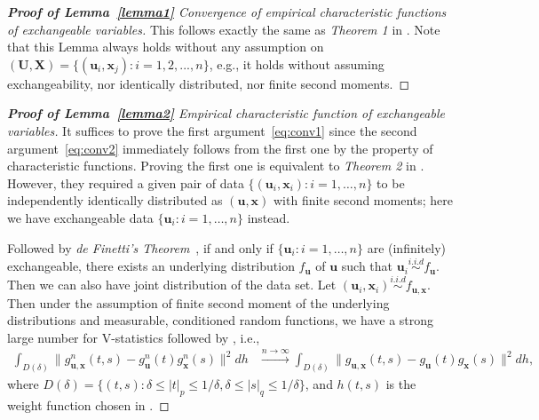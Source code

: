 \documentclass[11pt]{article}
\theoremstyle{definition}
\begin{document}
\begin{proof}[\textbf{Proof of Lemma~\ref{lemma1}} Convergence of empirical characteristic functions of exchangeable variables] 
This follows exactly the same as \textit{Theorem 1} in \cite{szekely2007measuring}. Note that this Lemma always holds without any assumption on $(\mathbf{U}, \mathbf{X} ) =  \{(\mathbf{u}_{i},\mathbf{x}_{j}) :  i=1,2,...,n\}$, e.g., it holds without assuming exchangeability, nor identically distributed, nor finite second moments.
\end{proof}

\begin{proof}[\textbf{Proof of Lemma~\ref{lemma2}} Empirical characteristic function of exchangeable variables] 
	\bigskip	
	It suffices to prove the first argument~\ref{eq:conv1} since the second argument~\ref{eq:conv2} immediately follows from the first one by the property of characteristic functions.
	Proving the first one is equivalent to \textit{Theorem 2} in \cite{szekely2007measuring}. However, they required a given pair of data $\{(\mathbf{u}_{i},\mathbf{x}_{i}) : i = 1, \ldots , n \}$ to be independently identically distributed as $(\mathbf{u},\mathbf{x})$ with finite second moments; here we have exchangeable data $\{  \mathbf{u}_{i} : i = 1, \ldots, n  \}$ instead. 
	
	Followed by \textit{de Finetti's Theorem}~\cite{diaconis1980finite}, if and only if $\{ \mathbf{u}_{i} : i = 1, \ldots, n \}$ are (infinitely) exchangeable, there exists an underlying distribution $f_{\mathbf{u}}$ of $\mathbf{u}$ such that $\mathbf{u}_{i}  \overset{i.i.d}{\sim} f_{\mathbf{u}} $. Then we can also have joint distribution of the data set. Let $(\mathbf{u}_{i}, \mathbf{x}_{i}) \overset{i.i.d}{\sim}   f_{\mathbf{u}, \mathbf{x}}$. Then under the assumption of finite second moment of the underlying distributions and measurable, conditioned random functions, we have a strong large number for V-statistics followed by \cite{szekely2007measuring}, i.e., 
	\begin{eqnarray}
	\displaystyle\int_{D(\delta)}{\|g_{\mathbf{u},\mathbf{x}}^{n}(t,s)-g_{\mathbf{u}}^{n}(t)g_{\mathbf{x}}^{n}(s)\|^{2}}dh &\stackrel{n \rightarrow \infty}{\longrightarrow} 
	\displaystyle\int_{D(\delta)}{\|g_{\mathbf{u},\mathbf{x}}(t,s)-g_{\mathbf{u}}(t)g_{\mathbf{x}}(s)\|^{2}}dh,
	\label{eq:SLLN}
	\end{eqnarray}
	where $D(\delta)=\{(t,s):\delta \leq |t|_{p} \leq 1/\delta,\delta \leq |s|_{q} \leq 1/\delta\}$, and $h(t,s)$ is the weight function chosen in \cite{szekely2007measuring}. 
\end{proof}
\end{document}

